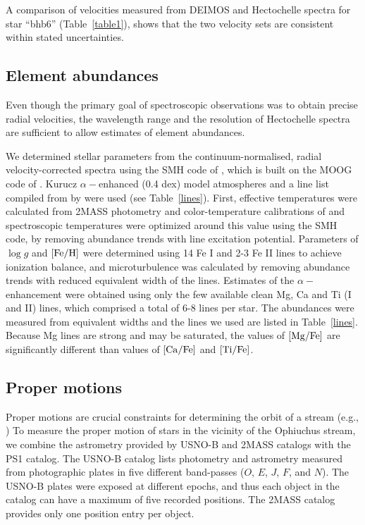 \documentclass[iop]{emulateapj}
\begin{document}
A comparison of velocities measured from DEIMOS and Hectochelle spectra for star
``bhb6'' (Table~\ref{table1}), shows that the two velocity sets are consistent
within stated uncertainties.

\subsection{Element abundances}

Even though the primary goal of spectroscopic observations was to obtain precise
radial velocities, the wavelength range and the resolution of Hectochelle
spectra are sufficient to allow estimates of element abundances.

We determined stellar parameters from the continuum-normalised, radial
velocity-corrected spectra using the SMH code of \citet{cas14}, which is built
on the MOOG code of \citet{sne73}. Kurucz $\alpha-$enhanced (0.4 dex) model
atmospheres \citep{ck04} and a line list compiled from \citet{fre10} by
\citet{cas14} were used (see Table~\ref{lines}). First, effective temperatures
were calculated from 2MASS photometry and color-temperature calibrations of
\citet{ghb09} and spectroscopic temperatures were optimized around this value
using the SMH code, by removing abundance trends with line excitation potential.
Parameters of $\log g$ and ${\rm [Fe/H]}$ were determined using 14 Fe I and 2-3 
Fe II lines to achieve ionization balance, and microturbulence was calculated by
removing abundance trends with reduced equivalent width of the lines. Estimates 
of the $\alpha-$enhancement were obtained using only the few available clean Mg,
Ca and Ti (I and II) lines, which comprised a total of 6-8 lines per star. The
abundances were measured from equivalent widths and the lines we used are listed
in Table~\ref{lines}. Because Mg lines are strong and may be saturated, the
values of ${\rm [Mg/Fe]}$ are significantly different than values of
${\rm [Ca/Fe]}$ and ${\rm [Ti/Fe]}$.

\subsection{Proper motions}

Proper motions are crucial constraints for determining the orbit of a stream
(e.g., \citealt{kop10}) To measure the proper motion of stars in the vicinity of
the Ophiuchus stream, we combine the astrometry provided by USNO-B \citep{mon03}
and 2MASS \citep{skr06} catalogs with the PS1 catalog. The USNO-B catalog lists
photometry and astrometry measured from photographic plates in five different
band-passes ($O$, $E$, $J$, $F$, and $N$). The USNO-B plates were exposed at
different epochs, and thus each object in the catalog can have a maximum of five
recorded positions. The 2MASS catalog provides only one position entry per
object.
\end{document}
